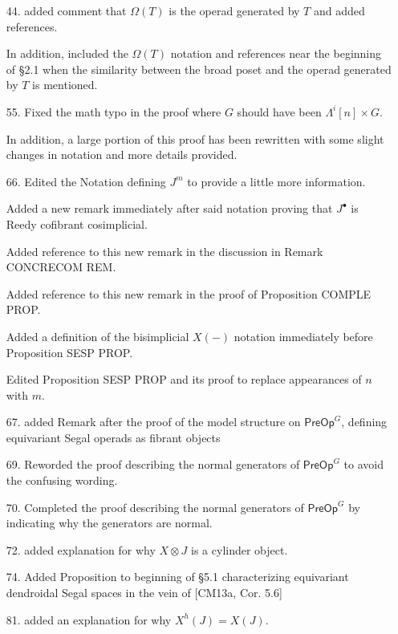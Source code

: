 \documentclass{article}
\begin{document}
\begin{itemize}
\item[44.] added comment that $\Omega(T)$ is the operad generated by $T$ and added references.

In addition, included the $\Omega(T)$ notation and references near the beginning of \S 2.1 when the similarity between the broad poset and the operad generated by $T$ is mentioned.

\item[55.] Fixed the math typo in the proof where $G$ should have been $\Lambda^i[n] \times G$.

In addition, a large portion of this proof has been rewritten with some slight changes in notation and more details provided.

\item[66.] Edited the Notation defining $J^m$ to provide a little more information.

Added a new remark immediately after said notation proving that $J^{\bullet}$ is Reedy cofibrant cosimplicial.

Added reference to this new remark in the discussion in Remark CONCRECOM REM.

Added reference to this new remark in the proof of Proposition COMPLE PROP.

Added a definition of the bisimplicial $X(-)$ notation immediately before Proposition SESP PROP.

Edited Proposition SESP PROP and its proof to replace appearances of $n$ with $m$.

\item[67.] added Remark after the proof of the model structure on $\mathsf{PreOp}^G$, defining equivariant Segal operads as fibrant objects

\item[69.] Reworded the proof describing the normal generators of $\mathsf{PreOp}^G$ to avoid the confusing wording.

\item[70.] Completed the proof describing the normal generators of $\mathsf{PreOp}^G$ by indicating why the generators are normal.

\item[72.] added explanation for why $X \otimes J$ is a cylinder object.

\item[74.] Added Proposition to beginning of \S 5.1 characterizing equivariant dendroidal Segal spaces in the vein of [CM13a, Cor. 5.6]

\item[81.] added an explanation for why $X^h(J) = X(J)$.
\end{itemize}
\end{document}
